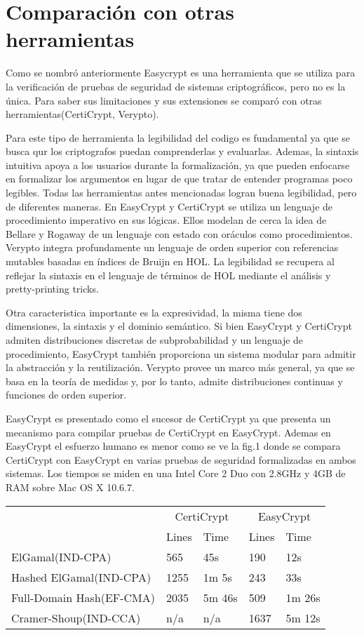 \documentclass[runningheads]{llncs}
\begin{document}
\section{Comparación con otras herramientas}
Como se nombró anteriormente Easycrypt es una herramienta que se utiliza para la verificación de pruebas de seguridad de sistemas criptográficos, pero no es la única. Para saber sus limitaciones y sus extensiones se comparó con otras herramientas(CertiCrypt, Verypto).

 Para este tipo de herramienta la legibilidad del codigo es fundamental ya que se busca qur los criptografos puedan comprenderlas y evaluarlas. Ademas, la sintaxis intuitiva apoya a los usuarios durante la formalización, ya que pueden enfocarse en formalizar los argumentos en lugar de que tratar de entender programas poco legibles. Todas las herramientas antes mencionadas logran buena legibilidad, pero de diferentes maneras. En EasyCrypt y CertiCrypt se utiliza un lenguaje de procedimiento imperativo en sus lógicas. Ellos modelan de cerca la idea de Bellare y Rogaway de un lenguaje con estado con oráculos como procedimientos\cite{ref_article3}. Verypto integra profundamente un lenguaje de orden superior con referencias mutables basadas en índices de Bruijn en HOL\cite{ref_article4}. La legibilidad se recupera al reflejar la sintaxis en el lenguaje de términos de HOL mediante el análisis y pretty-printing tricks.

 Otra caracteristica importante es la expresividad, la misma tiene dos dimensiones, la sintaxis y el dominio semántico. Si bien EasyCrypt y CertiCrypt admiten distribuciones discretas de subprobabilidad y un lenguaje de procedimiento, EasyCrypt también proporciona un sistema modular para admitir la abstracción y la reutilización. Verypto provee un marco más general, ya que se basa en la teoría de medidas y, por lo tanto, admite distribuciones continuas y funciones de orden superior.
 
EasyCrypt es presentado como el sucesor de CertiCrypt ya que  presenta un mecanismo para compilar pruebas de CertiCrypt en EasyCrypt. Ademas en EasyCrypt el esfuerzo humano es menor como se ve la fig.1 donde se compara CertiCrypt con EasyCrypt en varias pruebas de seguridad formalizadas en ambos sistemas. Los tiempos se miden en una Intel Core 2 Duo con 2.8GHz y 4GB de RAM sobre Mac OS X 10.6.7.



\begin{tabular}{ |p{3cm}|p{3cm}|p{3cm}|p{3cm}|p{3cm}|  }
 \hline
 & \multicolumn{2}{|c|}{CertiCrypt} & \multicolumn{2}{|c|}{EasyCrypt} \\\cline{2-5}
 
 &Lines&Time&Lines&Time\\\cline{2-5}
 \hline
 ElGamal(IND-CPA)   & 565    &45s &190 &12s \\
 Hashed ElGamal(IND-CPA)& 1255  & 1m 5s & 243  & 33s\\
 Full-Domain Hash(EF-CMA) &2035 & 5m 46s&  509 & 1m 26s\\
 Cramer-Shoup(IND-CCA)    &n/a & n/a& 1637 &5m 12s\\
 \hline
\end{tabular}
\end{document}

